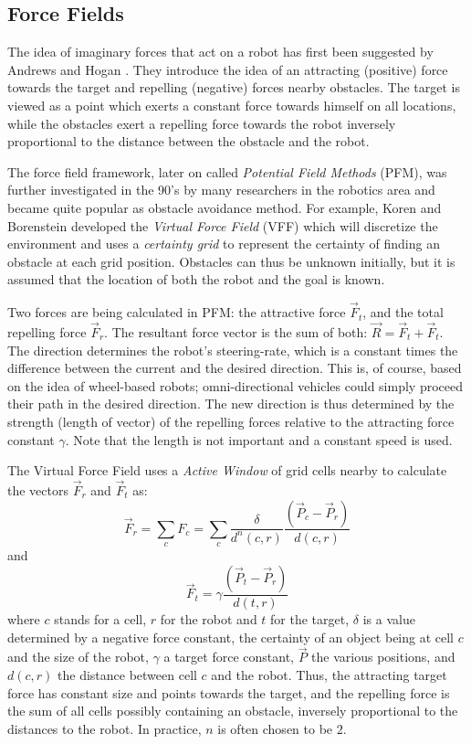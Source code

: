 \documentclass[11pt]{article}
\begin{document}
\subsection{Force Fields}

The idea of imaginary forces that act on a robot has first been suggested by Andrews and Hogan \cite{andrews83}. They introduce the idea of an attracting (positive) force towards the target and repelling (negative) forces nearby obstacles. The target is viewed as a point which exerts a constant force towards himself on all locations, while the obstacles exert a repelling force towards the robot inversely proportional to the distance between the obstacle and the robot.


The force field framework, later on called \emph{Potential Field Methods} (PFM), was further investigated in the 90's by many researchers in the robotics area and became quite popular as obstacle avoidance method. For example, Koren and Borenstein \cite{koren89} developed the \emph{Virtual Force Field} (VFF) which will discretize the environment and uses a \emph{certainty grid} to represent the certainty of finding an obstacle at each grid position. Obstacles can thus be unknown initially, but it is assumed that the location of both the robot and the goal is known.

Two forces are being calculated in PFM: the attractive force $\vec{F}_t$, and the total repelling force $\vec{F}_r$. The resultant force vector is the sum of both: $\vec{R} = \vec{F}_t + \vec{F}_t$. The direction determines the robot's steering-rate, which is a constant times the difference between the current and the desired direction. This is, of course, based on the idea of wheel-based robots; omni-directional vehicles could simply proceed their path in the desired direction. The new direction is thus determined by the strength (length of vector) of the repelling forces relative to the attracting force constant $\gamma$. Note that the length is not important and a constant speed is used.

The Virtual Force Field uses a \emph{Active Window} of grid cells nearby to calculate the vectors $\vec{F}_r$ and $\vec{F}_t$ as:
  \[ \vec{F}_r = \sum_{c} F_{c} = \sum_{c} \frac{\delta}{d^n(c, r)} \frac{(\vec{P}_c - \vec{P}_r)}{ d(c, r) } \]
and
  \[ \vec{F}_t = \gamma \frac{(\vec{P}_t - \vec{P}_r)}{ d(t, r) } \]
where $c$ stands for a cell, $r$ for the robot and $t$ for the target, $\delta$ is a value determined by a negative force constant, the certainty of an object being at cell $c$ and the size of the robot, $\gamma$ a target force constant, $\vec{P}$ the various positions, and $d(c, r)$ the distance between cell $c$ and the robot. Thus, the attracting target force has constant size and points towards the target, and the repelling force is the sum of all cells possibly containing an obstacle, inversely proportional to the distances to the robot. In practice, $n$ is often chosen to be $2$.
\end{document}
